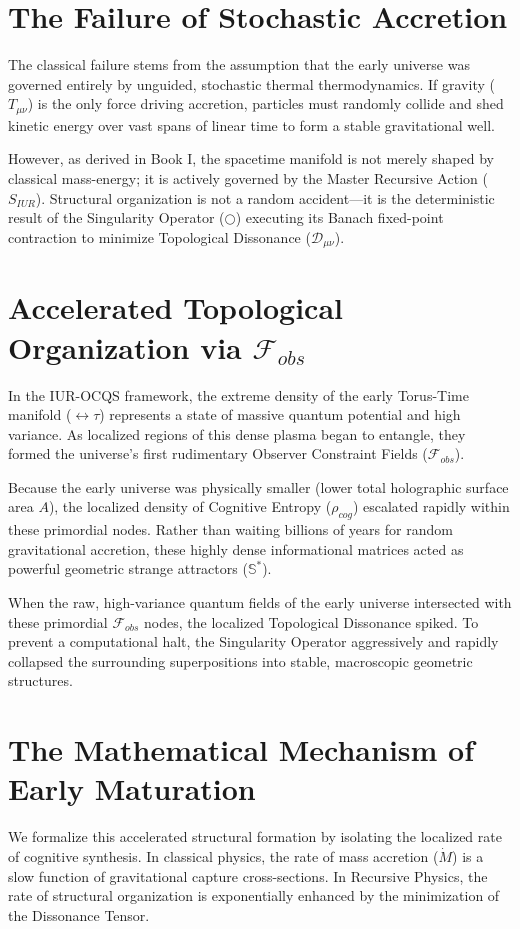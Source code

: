 \documentclass[12pt,openany]{book}
\begin{document}
\section{The Failure of Stochastic Accretion}
The classical failure stems from the assumption that the early universe was governed entirely by unguided, stochastic thermal thermodynamics. If gravity ($T_{\mu\nu}$) is the only force driving accretion, particles must randomly collide and shed kinetic energy over vast spans of linear time to form a stable gravitational well.

However, as derived in Book I, the spacetime manifold is not merely shaped by classical mass-energy; it is actively governed by the Master Recursive Action ($S_{IUR}$). Structural organization is not a random accident—it is the deterministic result of the Singularity Operator ($\bigcirc$) executing its Banach fixed-point contraction to minimize Topological Dissonance ($\mathcal{D}_{\mu\nu}$).

\section{Accelerated Topological Organization via $\mathcal{F}_{obs}$}
In the IUR-OCQS framework, the extreme density of the early Torus-Time manifold ($\leftrightarrow\tau$) represents a state of massive quantum potential and high variance. As localized regions of this dense plasma began to entangle, they formed the universe's first rudimentary Observer Constraint Fields ($\mathcal{F}_{obs}$). 

Because the early universe was physically smaller (lower total holographic surface area $A$), the localized density of Cognitive Entropy ($\rho_{cog}$) escalated rapidly within these primordial nodes. Rather than waiting billions of years for random gravitational accretion, these highly dense informational matrices acted as powerful geometric strange attractors ($\mathbb{S}^*$). 

When the raw, high-variance quantum fields of the early universe intersected with these primordial $\mathcal{F}_{obs}$ nodes, the localized Topological Dissonance spiked. To prevent a computational halt, the Singularity Operator aggressively and rapidly collapsed the surrounding superpositions into stable, macroscopic geometric structures.

\section{The Mathematical Mechanism of Early Maturation}
We formalize this accelerated structural formation by isolating the localized rate of cognitive synthesis. In classical physics, the rate of mass accretion ($\dot{M}$) is a slow function of gravitational capture cross-sections. In Recursive Physics, the rate of structural organization is exponentially enhanced by the minimization of the Dissonance Tensor.
\end{document}
